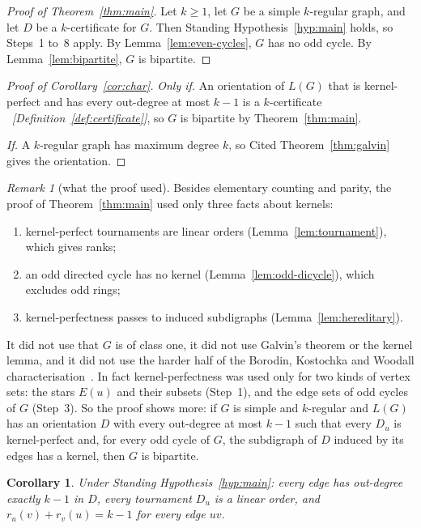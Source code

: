 \documentclass[11pt]{article}
\theoremstyle{plain}
\newtheorem{corollary}[theorem]{Corollary}
\theoremstyle{definition}
\theoremstyle{remark}
\newtheorem{remark}[theorem]{Remark}
\newcommand{\LG}{L(G)}
\newcommand{\st}[1]{E(#1)}
\newcommand{\why}[1]{\unskip\ \textit{[#1]}}
\begin{document}
\begin{proof}[Proof of Theorem~\ref{thm:main}]
Let $k\ge 1$, let $G$ be a simple $k$-regular graph, and let $D$ be a $k$-certificate for $G$.
Then Standing Hypothesis~\ref{hyp:main} holds, so Steps~1 to~8 apply. By
Lemma~\ref{lem:even-cycles}, $G$ has no odd cycle. By Lemma~\ref{lem:bipartite}, $G$ is
bipartite.
\end{proof}

\begin{proof}[Proof of Corollary~\ref{cor:char}]
\emph{Only if.} An orientation of $\LG$ that is kernel-perfect and has every out-degree at most
$k-1$ is a $k$-certificate \why{Definition~\ref{def:certificate}}, so $G$ is bipartite by
Theorem~\ref{thm:main}.

\emph{If.} A $k$-regular graph has maximum degree $k$, so Cited Theorem~\ref{thm:galvin} gives
the orientation.
\end{proof}

\begin{remark}[what the proof used]
Besides elementary counting and parity, the proof of Theorem~\ref{thm:main} used only three
facts about kernels:
\begin{enumerate}[label=(\roman*)]
  \item kernel-perfect tournaments are linear orders (Lemma~\ref{lem:tournament}), which gives
    ranks;
  \item an odd directed cycle has no kernel (Lemma~\ref{lem:odd-dicycle}), which excludes odd
    rings;
  \item kernel-perfectness passes to induced subdigraphs (Lemma~\ref{lem:hereditary}).
\end{enumerate}
It did not use that $G$ is of class one, it did not use Galvin's theorem or the kernel lemma,
and it did not use the harder half of the Borodin, Kostochka and Woodall
characterisation~\cite{bkw}. In fact kernel-perfectness was used only for two kinds of vertex sets: the stars $\st{u}$ and
their subsets (Step~1), and the edge sets of odd cycles of $G$ (Step~3). So the proof shows more:
if $G$ is simple and $k$-regular and $\LG$ has an orientation $D$ with every out-degree at most
$k-1$ such that every $D_u$ is kernel-perfect and, for every odd cycle of $G$, the subdigraph of
$D$ induced by its edges has a kernel, then $G$ is bipartite.
\end{remark}

\begin{corollary}\label{cor:shape}
Under Standing Hypothesis~\ref{hyp:main}: every edge has out-degree exactly $k-1$ in $D$, every
tournament $D_u$ is a linear order, and $r_u(v)+r_v(u)=k-1$ for every edge $uv$.
\end{corollary}
\end{document}
